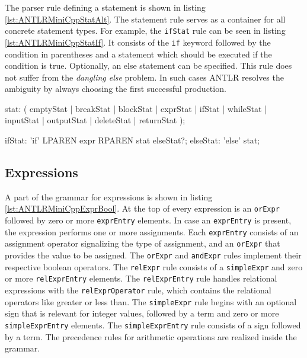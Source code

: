 The parser rule defining a statement is shown in listing \ref{lst:ANTLRMiniCppStatAlt}. The statement rule serves as a container for all concrete statement types. For example, the \texttt{ifStat} rule can be seen in listing \ref{lst:ANTLRMiniCppStatIf}. It consists of the \texttt{if} keyword followed by the condition in parentheses and a statement which should be executed if the condition is true. Optionally, an else statement can be specified. This rule does not suffer from the \textit{dangling else} problem. In such cases ANTLR resolves the ambiguity by always choosing the first successful production. 

\begin{AntlrCode}[float,numbers=none,caption=Statement rule and it's production alternatives of the MiniC++ ANTLR grammar., label=lst:ANTLRMiniCppStatAlt]
stat:  ( emptyStat  | breakStat
       | blockStat  | exprStat
       | ifStat     | whileStat
       | inputStat  | outputStat
       | deleteStat | returnStat
       );
\end{AntlrCode}

\begin{AntlrCode}[float,numbers=none,caption=If Statement rule for the MiniC++ ANTLR grammar., label=lst:ANTLRMiniCppStatIf]
ifStat:      'if' LPAREN expr RPAREN stat elseStat?;
elseStat:    'else' stat;
\end{AntlrCode}



\subsection{Expressions}

A part of the grammar for expressions is shown in listing \ref{lst:ANTLRMiniCppExprBool}. At the top of every expression is an \texttt{orExpr} followed by zero or more \texttt{exprEntry} elements. In case an \texttt{exprEntry} is present, the expression performs one or more assignments. Each \texttt{exprEntry} consists of an assignment operator signalizing the type of assignment, and an \texttt{orExpr} that provides the value to be assigned. The \verb|orExpr| and \verb|andExpr| rules implement their respective boolean operators. The \verb|relExpr| rule consists of a \verb|simpleExpr| and zero or more \verb|relExprEntry| elements. The \verb|relExprEntry| rule handles relational expressions with the \verb|relExprOperator| rule, which contains the relational operators like greater or less than. The \verb|simpleExpr| rule begins with an optional sign that is relevant for integer values, followed by a term and zero or more \verb|simpleExprEntry| elements. The \verb|simpleExprEntry| rule consists of a sign followed by a term. The precedence rules for arithmetic operations are realized inside the grammar.



